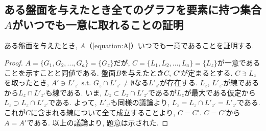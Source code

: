 \chapter{}\label{chapter:AppendixA}
\section{ある盤面を与えたとき全てのグラフを要素に持つ集合$A$がいつでも一意に取れることの証明}
ある盤面を与えたとき, $A$（\cref{equation:A}）いつでも一意であることを証明する.
\begin{proof}\label{proof:GraphUnique}
  $A=\{G_1,G_2,...,G_a\}=\{G_z\}$だが, $C=\{L_1,L_2,...,L_a\}=\{L_z\}$が一意であることを示すことと同値である. 盤面$B$を与えたとき$C$, $C'$が定まるとする. $C\ni  L_z$を取ったとき, $A'\ni  L'_{z'} \mbox{ s.t. $G_z \cap L'_{z'} \neq \emptyset $}$なる$L'_{z'}$が存在する. $L_z$, $L'_{z'}$が線であるから$L_z\cap L'_{z'}$も線である. いま, $L_z\subset L_z\cap L'_{z'}$であるが$L_z$が最大である仮定から$L_z\supset L_z\cap L'_{z'}$である. よって, $L'_{z'}$も同様の議論より, $L_z= L_z\cap L'_{z'}=L'_{z'}$である. これが$C$に含まれる線について全て成立することより, $C=C'$. $C=C'$から$A=A'$である. 以上の議論より, 題意は示された.
\end{proof}